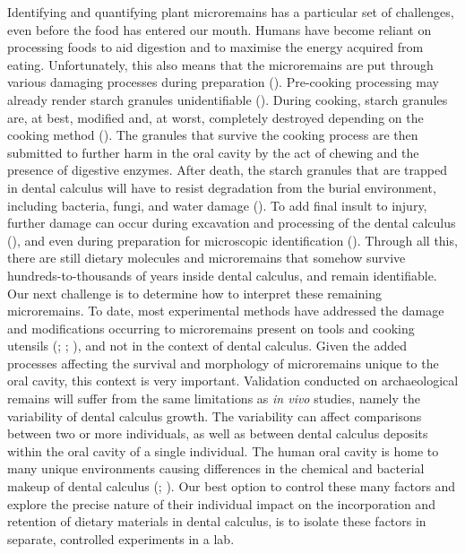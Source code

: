 \documentclass[
  b5paper,
]{book}
\begin{document}
Identifying and quantifying plant microremains has a particular set of
challenges, even before the food has entered our mouth. Humans have
become reliant on processing foods to aid digestion and to maximise the
energy acquired from eating. Unfortunately, this also means that the
microremains are put through various damaging processes during
preparation (). Pre-cooking processing may already render starch granules
unidentifiable (). During cooking, starch granules are, at best, modified and, at
worst, completely destroyed depending on the cooking method
(). The
granules that survive the cooking process are then submitted to further
harm in the oral cavity by the act of chewing and the presence of
digestive enzymes. After death, the starch granules that are trapped in
dental calculus will have to resist degradation from the burial
environment, including bacteria, fungi, and water damage
(). To
add final insult to injury, further damage can occur during excavation
and processing of the dental calculus
(), and even
during preparation for microscopic identification
().
Through all this, there are still dietary molecules and microremains
that somehow survive hundreds-to-thousands of years inside dental
calculus, and remain identifiable. Our next challenge is to determine
how to interpret these remaining microremains. To date, most
experimental methods have addressed the damage and modifications
occurring to microremains present on tools and cooking utensils
(;
;
), and not
in the context of dental calculus. Given the added processes affecting
the survival and morphology of microremains unique to the oral cavity,
this context is very important. Validation conducted on archaeological
remains will suffer from the same limitations as \emph{in vivo} studies,
namely the variability of dental calculus growth. The variability can
affect comparisons between two or more individuals, as well as between
dental calculus deposits within the oral cavity of a single individual.
The human oral cavity is home to many unique environments causing
differences in the chemical and bacterial makeup of dental calculus
(; ). Our best option to control these many factors and explore the
precise nature of their individual impact on the incorporation and
retention of dietary materials in dental calculus, is to isolate these
factors in separate, controlled experiments in a lab.
\end{document}

